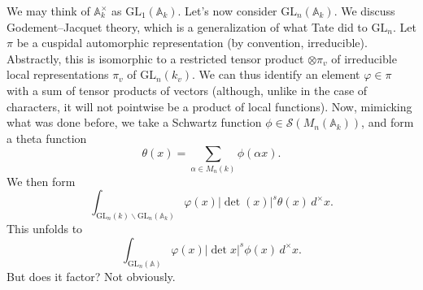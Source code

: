 \documentclass[reqno]{amsart} 
\begin{document}
We may think of $\mathbb{A}_k^\times$ as $\mathrm{GL}_1(\mathbb{A}_k)$.  Let's now consider $\mathrm{GL}_n(\mathbb{A}_k)$.  We discuss Godement--Jacquet theory, which is a generalization of what Tate did to $\mathrm{GL}_n$.  Let $\pi$ be a cuspidal automorphic representation (by convention, irreducible).  Abstractly, this is isomorphic to a restricted tensor product $\otimes \pi_v$ of irreducible local representations $\pi_v$ of $\mathrm{GL}_n(k_v)$.  We can thus identify an element $\varphi \in \pi$ with a sum of tensor products of vectors (although, unlike in the case of characters, it will not pointwise be a product of local functions).  Now, mimicking what was done before, we take a Schwartz function $\phi \in \mathcal{S}(M_n(\mathbb{A}_k))$, and form a theta function
\begin{equation*}
  \theta(x)
  =
  \sum_{\alpha \in M_n(k)}
  \phi(\alpha x).
\end{equation*}
We then form
\begin{equation*}
  \int_{\mathrm{GL}_n(k) \backslash \mathrm{GL}_n(\mathbb{A}_k)}
  \varphi(x) \lvert \det(x) \rvert^s \theta(x) \,d^\times x.
\end{equation*}
This unfolds to
\begin{equation*}
  \int_{\mathrm{GL}_n(\mathbb{A})} \varphi(x) \lvert \det x \rvert^s \phi(x) \, d^\times x.
\end{equation*}
But does it factor?  Not obviously.
\end{document}
